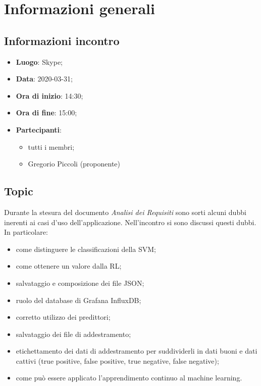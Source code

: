 \section{Informazioni generali}
\subsection{Informazioni incontro}
\begin{itemize}
\item \textbf{Luogo}: Skype;
\item \textbf{Data}: 2020-03-31;
\item \textbf{Ora di inizio}: 14:30;
\item \textbf{Ora di fine}: 15:00;
\item \textbf{Partecipanti}:
	\begin{itemize}
		\item tutti i membri;
		\item Gregorio Piccoli (proponente)
	\end{itemize}
\end{itemize}

\subsection{Topic}
Durante la stesura del documento \textit{Analisi dei Requisiti} sono sorti alcuni dubbi inerenti ai casi d'uso dell'applicazione. Nell'incontro si sono discussi questi dubbi.\\
In particolare:
\begin{itemize}
	\item come distinguere le classificazioni della SVM;
	\item come ottenere un valore dalla RL;
	\item salvataggio e composizione dei file JSON;
	\item ruolo del database di Grafana InfluxDB;
	\item corretto utilizzo dei predittori;
	\item salvataggio dei file di addestramento;
	\item etichettamento dei dati di addestramento per suddividerli in dati buoni e dati cattivi (true positive, false positive, true negative, false negative);
	\item come può essere applicato l'apprendimento continuo al machine learning.
\end{itemize}